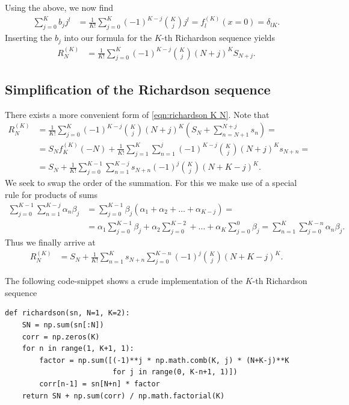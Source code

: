 \documentclass[english, parskip=full]{scrartcl}
\newcommand{\kla}{}
\begin{document}
Using the above, we now find 
\begin{align}
\sum_{j=0}^Kb_jj^l &= \frac{1}{K!} \sum_{j=0}^K (-1)^{K-j}\binom{K}{j} j^l = f_l^{(K)}(x=0) = \delta_{lK}.
\end{align}
Inserting the $b_j$ into our formula for the $K$-th Richardson sequence yields
\begin{align}
R_N^{(K)} &= \frac{1}{K!}\sum_{j=0}^K (-1)^{K-j} \binom{K}{j} (N+j)^K S_{N+j}. \label{eqn:richardson K N}
\end{align}

\subsection{Simplification of the Richardson sequence}
There exists a more convenient form of \autoref{eqn:richardson K N}.
Note that 
\begin{align}
R_N^{(K)} &= \frac{1}{K!} \sum_{j=0}^K (-1)^{K-j} \binom{K}{j} (N+j)^K \kla\left( S_N + \sum_{n=N+1}^{N+j} s_{n} \right) = \\
&= S_N f_K^{(K)}(-N) + \frac{1}{K!} \sum_{j=1}^K \sum_{n=1}^{j} (-1)^{K-j} \binom{K}{j} (N+j)^K s_{N + n} = \\
&= S_N + \frac{1}{K!} \sum_{j=0}^{K-1}\sum_{n=1}^{K-j} s_{N+n} (-1)^j \binom{K}{j} (N+K-j)^K.
\end{align}
We seek to swap the order of the summation.
For this we make use of a special rule for products of sums
\begin{align}
\sum_{j=0}^{K-1} \sum_{n=1}^{K-j} \alpha_n\beta_j &= \sum_{j=0}^{K-1} \beta_j \kla\left( \alpha_1 + \alpha_2 + \dots + \alpha_{K-j} \right) = \\
&= \alpha_1 \sum_{j=0}^{K-1} \beta_j + \alpha_2 \sum_{j=0}^{K-2} + \dots + \alpha_{K} \sum_{j=0}^{0}\beta_j = \sum_{n=1}^K \sum_{j=0}^{K-n} \alpha_n\beta_j.
\end{align}
Thus we finally arrive at 
\begin{align}
R_N^{(K)} &= S_N + \frac{1}{K!}\sum_{n=1}^{K} s_{N+n} \sum_{j=0}^{K-n} (-1)^j \binom{K}{j} (N+K-j)^K.
\end{align}


The following code-snippet shows a crude implementation of the $K$-th Richardson sequence
\begin{verbatim}
def richardson(sn, N=1, K=2):
    SN = np.sum(sn[:N])
    corr = np.zeros(K)
    for n in range(1, K+1, 1):
        factor = np.sum([(-1)**j * np.math.comb(K, j) * (N+K-j)**K 
                         for j in range(0, K-n+1, 1)])
        corr[n-1] = sn[N+n] * factor
    return SN + np.sum(corr) / np.math.factorial(K)
\end{verbatim}
\end{document}
